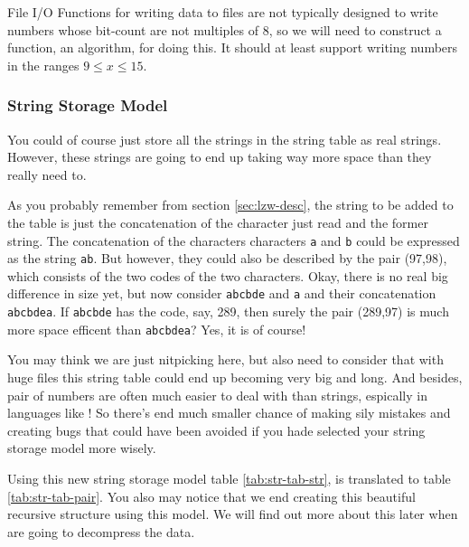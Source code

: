 \begin{refsection}
File I/O Functions for writing data to files are not typically
designed to write numbers whose bit-count are not multiples of 8, so
we will need to construct a function, an algorithm, for doing this. It
should at least support writing numbers in the ranges  $9 \leq x \leq 15$.


\subsubsection{String Storage Model}

\newcommand{\strpair}[2]{(#1,#2)}

You could of course just store all the strings in the string table as
real strings. However, these strings are going to end up
taking way more space than they really need to.

As you probably remember from section \ref{sec:lzw-desc}, the string
to be added to the table is just the concatenation of the character
just read and the former string. The concatenation of the characters
characters \texttt{a} and \texttt{b} could be expressed as the string
\texttt{ab}. But however, they could also be described by the
pair \strpair{97}{98}, which consists of the two codes of
the two characters. Okay, there is no real big difference in size yet,
but now consider \texttt{abcbde} and \texttt{a} and their
concatenation \texttt{abcbdea}. If \texttt{abcbde} has the code, say,
289, then surely the pair \strpair{289}{97} is much more space
efficent than \texttt{abcbdea}?  Yes, it is of course!

You may think we are just nitpicking here, but also need to consider
that with huge files this string table could end up becoming very big
and long. And besides, pair of numbers are often much easier to deal
with than strings, espically in languages like \C! So there's end much
smaller chance of making sily mistakes and creating bugs that could
have been avoided if you hade selected your string storage model more
wisely.

Using this new string storage model table \ref{tab:str-tab-str}, is
translated to table \ref{tab:str-tab-pair}. You also may notice that we end
creating this beautiful recursive structure using this model. We will
find out more about this later when are going to decompress the data.

\newcommand{\pairrow}[3]{$#1$ & \strpair{#2}{#3} \\}


\end{refsection}
